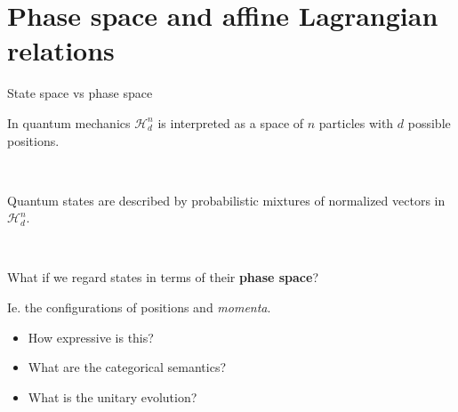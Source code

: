 \documentclass{beamer}
\begin{document}
\section{Phase space and affine Lagrangian relations}

\begin{frame}{State space vs phase space}

In quantum mechanics \(\mathcal{H}_d^n\) is interpreted  as a space of \(n\) particles with \(d\) possible positions.

\

Quantum states are described by probabilistic mixtures of normalized vectors in \(\mathcal{H}_d^n\).

\


What if we regard states in terms of their \textbf{phase space}?

Ie. the configurations of positions and \emph{momenta}.

\begin{itemize}
\item \textbf{\textbullet}
How expressive is this?

\item \textbf{\textbullet}
What are the categorical semantics?

\item \textbf{\textbullet}
What is the unitary evolution?
\end{itemize}
\end{frame}
\end{document}
